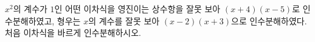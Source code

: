 $x^2$의 계수가 $1$인 어떤 이차식을 영진이는 상수항을 잘못 보아 $(x+4)(x-5)$로 인수분해하였고, 형우는 $x$의 계수를 잘못 보아 $(x-2)(x+3)$으로 인수분해하였다. 처음 이차식을 바르게 인수분해하시오.
